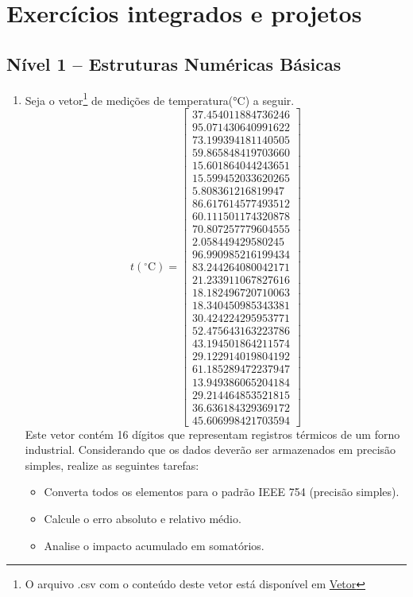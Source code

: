 \section{Exercícios integrados e projetos} \label{sec:ExercicioIntetradosProjetos}


\subsection*{Nível 1 -- Estruturas Numéricas Básicas}

\begin{enumerate}[label=\thesection.\arabic*]

\item Seja o vetor\footnote{O arquivo .csv com o conteúdo deste vetor está disponível 
em \href{https://github.com/JonathaCosta-IA/NM/blob/main/B-NM_codes/SolListaExerciciosPropostos/z_AplicMN_eng/dados.csv}{Vetor}} de medições de temperatura(°C) a seguir.
\[
t(^{\circ}\mathrm{C}) = \begin{bmatrix}
	37.454011884736246 \\
	95.071430640991622 \\
	73.199394181140505 \\
	59.865848419703660 \\
	15.601864044243651 \\
	15.599452033620265 \\
	5.808361216819947 \\
	86.617614577493512 \\
	60.111501174320878 \\
	70.807257779604555 \\
	2.058449429580245 \\
	96.990985216199434 \\
	83.244264080042171 \\
	21.233911067827616 \\
	18.182496720710063 \\
	18.340450985343381 \\
	30.424224295953771 \\
	52.475643163223786 \\
	43.194501864211574 \\
	29.122914019804192 \\
	61.185289472237947 \\
	13.949386065204184 \\
	29.214464853521815 \\
	36.636184329369172 \\
	45.606998421703594
\end{bmatrix}
\]
Este vetor contém 16 dígitos que representam registros térmicos de um forno industrial. 
Considerando que os dados deverão ser armazenados em precisão simples, realize as seguintes tarefas:
	\begin{itemize}
	\item Converta todos os elementos para o padrão IEEE 754 (precisão simples).
	\item Calcule o erro absoluto e relativo médio.
	\item Analise o impacto acumulado em somatórios.
	\end{itemize}

	
\end{enumerate}
